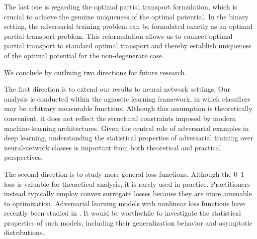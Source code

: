 \documentclass{amsart}
\theoremstyle{plain}
\numberwithin{equation}{section}\newtheorem{theorem}{Theorem}[section]
\theoremstyle{remark}
\begin{document}
The last one is regarding the optimal partial transport formulation, which is crucial to achieve the genuine uniqueness of the optimal potential. In the binary setting, the adversarial training problem can be formulated exactly as an optimal partial transport problem. This reformulation allows us to connect optimal partial transport to standard optimal transport and thereby establish uniqueness of the optimal potential for the non-degenerate case. 



We conclude by outlining two directions for future research.

The first direction is to extend our results to neural-network settings. Our analysis is conducted within the agnostic learning framework, in which classifiers may be arbitrary measurable functions. Although this assumption is theoretically convenient, it does not reflect the structural constraints imposed by modern machine-learning architectures. Given the central role of adversarial examples in deep learning, understanding the statistical properties of adversarial training over neural-network classes is important from both theoretical and practical perspectives.



The second direction is to study more general loss functions. Although the $0$--$1$ loss is valuable for theoretical analysis, it is rarely used in practice. Practitioners instead typically employ convex surrogate losses because they are more amenable to optimization. Adversarial learning models with nonlinear loss functions have recently been studied in \cite{trillos2025lowerboundsadversarialrobustness}. It would be worthwhile to investigate the statistical properties of such models, including their generalization behavior and asymptotic distributions.











\end{document}
